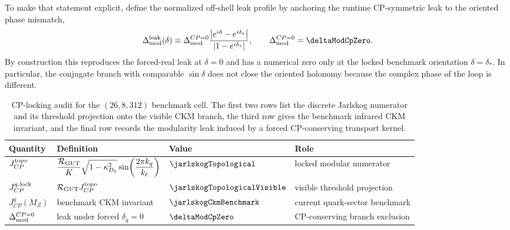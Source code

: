 \documentclass[11pt]{article}
\begin{document}
To make that statement explicit, define the normalized off-shell leak profile
by anchoring the runtime CP-symmetric leak to the oriented phase mismatch,
\begin{equation}
 \Delta_{\rm mod}^{\rm leak}(\delta)
 \equiv
 \Delta_{\rm mod}^{CP=0}
 \frac{\left|e^{i\delta}-e^{i\delta_*}\right|}{\left|1-e^{i\delta_*}\right|},
 \qquad
 \Delta_{\rm mod}^{CP=0}=\deltaModCpZero.
\end{equation}
By construction this reproduces the forced-real leak at $\delta=0$ and has a
numerical zero only at the locked benchmark orientation $\delta=\delta_*$. In
particular, the conjugate branch with comparable $\sin\delta$ does not close
the oriented holonomy because the complex phase of the loop is different.

\begin{table}[t]
\centering
\small
\begin{tabular}{llll}
\hline
Quantity & Definition & Value & Role \\
\hline
$J_{CP}^{\rm topo}$ & $\dfrac{\mathcal R_{\rm GUT}}{K}\sqrt{1-\kappa_{D_5}^2}\sin\!\left(\dfrac{2\pi k_q}{k_{\ell}}\right)$ & $\jarlskogTopological$ & locked modular numerator \\
$J_{CP}^{q,{\rm lock}}$ & $\mathcal R_{\rm GUT}J_{CP}^{\rm topo}$ & $\jarlskogTopologicalVisible$ & visible threshold projection \\
$J_{CP}^{q}(M_Z)$ & benchmark CKM invariant & $\jarlskogCkmBenchmark$ & current quark-sector benchmark \\
$\Delta_{\rm mod}^{CP=0}$ & leak under forced $\delta_q=0$ & $\deltaModCpZero$ & CP-conserving branch exclusion \\
\hline
\end{tabular}
\caption{CP-locking audit for the $(26,8,312)$ benchmark cell. The first two rows list the discrete Jarlskog numerator and its threshold projection onto the visible CKM branch, the third row gives the benchmark infrared CKM invariant, and the final row records the modularity leak induced by a forced CP-conserving transport kernel.}
\label{tab:s11-cp-locking}
\end{table}
\end{document}
